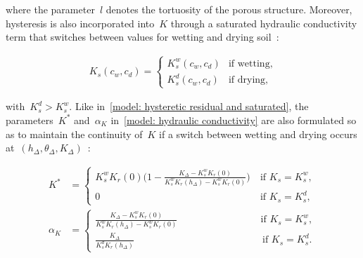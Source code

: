 \documentclass[11pt,a4paper]{article}
\numberwithin{equation}{section}
\begin{document}
where the parameter~$l$ denotes the tortuosity of the porous structure. Moreover, hysteresis is also incorporated into~$K$ through a saturated hydraulic conductivity term that switches between values for wetting and drying soil~\citep{vogel1996hydrus}:
\begin{linenomath*}
	\begin{equation}\label{model: saturated hydraulic conductivity}
		\begin{aligned}
			K_{s}(c_w, c_d) =
			\begin{cases}
				K_s^w(c_w, c_d) &\text{if wetting,}\\
				K_s^d(c_w, c_d) &\text{if drying,}
			\end{cases}
		\end{aligned}
	\end{equation}
\end{linenomath*}
with~$K_s^d>K_s^w$. Like in~\eqref{model: hysteretic residual and saturated}, the parameters~$K^*$ and~$\alpha_K$ in~\eqref{model: hydraulic conductivity} are also formulated so as to maintain the continuity of~$K$ if a switch between wetting and drying occurs at~$(h_\Delta,\theta_\Delta, K_\Delta)$~\citep{vogel1996hydrus}:
\begin{linenomath*}
	\begin{equation}\label{model: hydraulic conductivity hysteresis parameters}
		\begin{aligned}
			K^*&= 
			\begin{cases}
				K_s^wK_r(0)\Big(1-\frac{K_\Delta - K_s^wK_r(0)}{K_s^wK_r(h_\Delta) - K_s^wK_r(0)}\Big) \ &\text{if }K_s = K_s^w,\\
				 0 &\text{if }K_s = K_s^d,
			\end{cases}\\
			\alpha_K
			&=
			\begin{cases}
				\frac{K_\Delta-K_s^wK_r(0)}{K_s^wK_r(h_\Delta) - K_s^wK_r(0)} \qquad\qquad\qquad\qquad\ \ \text{if }K_s = K_s^w,\\
				\frac{K_\Delta}{K_s^dK_r(h_\Delta)} \qquad\qquad\qquad\qquad\qquad\qquad\quad \text{if }K_s = K_s^d.
			\end{cases} 			
		\end{aligned}
	\end{equation}
\end{linenomath*}   
\end{document}
